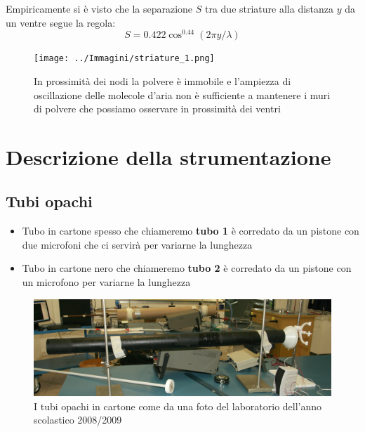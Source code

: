 \documentclass[a4paper,10pt,oneside]{article}
\begin{document}
Empiricamente si è visto che la separazione $S$ tra due striature alla distanza $y$ da un ventre segue la regola:
\begin{equation}
 S=0.422\cos^{0.44}(2\pi y/\lambda)
\end{equation}


\begin{figure}[H]
 \centering
 \texttt{[image: ../Immagini/striature\_1.png]}
 \caption{In prossimità dei nodi la polvere è immobile e l'ampiezza di oscillazione delle molecole d'aria non è sufficiente a mantenere i muri di polvere che possiamo osservare in prossimità dei ventri}
 \label{fig:striature_ventri}
\end{figure}


\section{Descrizione della strumentazione}

\subsection{Tubi opachi}
\begin{itemize}
 \item Tubo in cartone spesso che chiameremo \textbf{tubo 1} è corredato da un pistone con due microfoni che ci servirà per variarne la lunghezza
\item Tubo in cartone nero che chiameremo \textbf{tubo 2} è corredato da un pistone con un microfono per variarne la lunghezza
\end{itemize}

\begin{figure}[H]
 \centering
 \includegraphics[width=\textwidth]{../Immagini/tubi_cartone.jpg}
 \caption{I tubi opachi in cartone come da una foto del laboratorio dell'anno scolastico 2008/2009}
 \label{fig:tubi_cartone}
\end{figure}
\end{document}
